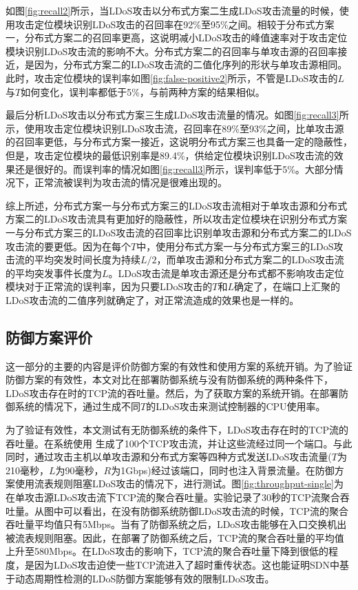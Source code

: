 如图\ref{fig:recall2}所示，当LDoS攻击以分布式方案二生成LDoS攻击流量的时候，使用攻击定位模块识别LDoS攻击的召回率在92\%至95\%之间。相较于分布式方案一，分布式方案二的召回率更高，这说明减小LDoS攻击的峰值速率对于攻击定位模块识别LDoS攻击流的影响不大。分布式方案二的召回率与单攻击源的召回率接近，是因为，分布式方案二的LDoS攻击流的二值化序列的形状与单攻击源相同。此时，攻击定位模块的误判率如图\ref{fig:false-positive2}所示，不管是LDoS攻击的$L$与$T$如何变化，误判率都低于5\%，与前两种方案的结果相似。

最后分析LDoS攻击以分布式方案三生成LDoS攻击流量的情况。如图\ref{fig:recall3}所示，使用攻击定位模块识别LDoS攻击流，召回率在89\%至93\%之间，比单攻击源的召回率更低，与分布式方案一接近，这说明分布式方案三也具备一定的隐蔽性，但是，攻击定位模块的最低识别率是89.4\%，供给定位模块识别LDoS攻击流的效果还是很好的。而误判率的情况如图\ref{fig:recall3}所示，误判率低于5\%。大部分情况下，正常流被误判为攻击流的情况是很难出现的。

综上所述，分布式方案一与分布式方案三的LDoS攻击流相对于单攻击源和分布式方案二的LDoS攻击流具有更加好的隐蔽性，所以攻击定位模块在识别分布式方案一与分布式方案三的LDoS攻击流的召回率比识别单攻击源和分布式方案二的LDoS攻击流的要更低。因为在每个$T$中，使用分布式方案一与分布式方案三的LDoS攻击流的平均突发时间长度为持续$L/2$，而单攻击源和分布式方案二的LDoS攻击流的平均突发事件长度为$L$。LDoS攻击流是单攻击源还是分布式都不影响攻击定位模块对于正常流的误判率，因为只要LDoS攻击的$T$和$L$确定了，在端口上汇聚的LDoS攻击流的二值序列就确定了，对正常流造成的效果也是一样的。


\subsection{防御方案评价}
\label{chap05:evaluaion}

这一部分的主要的内容是评价防御方案的有效性和使用方案的系统开销。为了验证防御方案的有效性，本文对比在部署防御系统与没有防御系统的两种条件下，LDoS攻击存在时的TCP流的吞吐量。然后，为了获取方案的系统开销。在部署防御系统的情况下，通过生成不同$T$的LDoS攻击来测试控制器的CPU使用率。

为了验证有效性，本文测试有无防御系统的条件下，LDoS攻击存在时的TCP流的吞吐量。在系统使用
生成了100个TCP攻击流，并让这些流经过同一个端口。与此同时，通过攻击主机以单攻击源和分布式方案等四种方式发送LDoS攻击流量($T$为210毫秒，$L$为90毫秒，$R$为1Gbps)经过该端口，同时也注入背景流量。在防御方案使用流表规则阻塞LDoS攻击的情况下，进行测试。图\ref{fig:throughput-single}为在单攻击源LDoS攻击流下TCP流的聚合吞吐量。实验记录了30秒的TCP流聚合吞吐量。从图中可以看出，在没有防御系统防御LDoS攻击流的时候，TCP流的聚合吞吐量平均值只有5Mbps。当有了防御系统之后，LDoS攻击能够在入口交换机出被流表规则阻塞。因此，在部署了防御系统之后，TCP流的聚合吞吐量的平均值上升至580Mbps。在LDoS攻击的影响下，TCP流的聚合吞吐量下降到很低的程度，是因为LDoS攻击迫使一些TCP流进入了超时重传状态。这也能证明SDN中基于动态周期性检测的LDoS防御方案能够有效的限制LDoS攻击。


